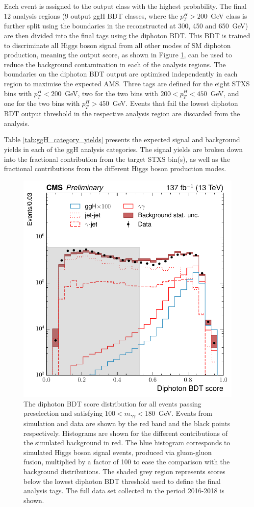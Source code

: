 Each event is assigned to the output class with the highest probability. The final 12 analysis regions (9 output ggH BDT classes, where the $p_T^H>200$~GeV class is further split using the boundaries in the reconstructed \ptgg at 300, 450 and 650~GeV) are then divided into the final tags using the diphoton BDT. This BDT is trained to discriminate all Higgs boson signal from all other modes of SM diphoton production, meaning the output score, as shown in Figure \ref{fig:diphoton_score}, can be used to reduce the background contamination in each of the analysis regions. The boundaries on the diphoton BDT output are optimised independently in each region to maximise the expected AMS. Three tags are defined for the eight STXS bins with $p_T^H<200$~GeV, two for the two bins with $200<p_T^H<450$~GeV, and one for the two bins with $p_T^H>450$~GeV. Events that fail the lowest diphoton BDT output threshold in the respective analysis region are discarded from the analysis. 

Table \ref{tab:ggH_category_yields} presents the expected signal and background yields in each of the ggH analysis categories. The signal yields are broken down into the fractional contribution from the target STXS bin(s), as well as the fractional contributions from the different Higgs boson production modes.

\begin{figure}[hptb]
  \centering
  \includegraphics[width=.5\textwidth]{Figures/hgg_overview/DiphotonBDT.pdf}
  \caption[Diphoton BDT output distribution]
  {
    The diphoton BDT score distribution for all events passing preselection and satisfying $100<m_{\gamma\gamma}<180$~GeV. Events from simulation and data are shown by the red band and the black points respectively. Histograms are shown for the different contributions of the simulated background in red. The blue histogram corresponds to simulated Higgs boson signal events, produced via gluon-gluon fusion, multiplied by a factor of 100 to ease the comparison with the background distributions. The shaded grey region represents scores below the lowest diphoton BDT threshold used to define the final analysis tags. The full data set collected in the period 2016-2018 is shown.
  }
  \label{fig:diphoton_score}
\end{figure}

